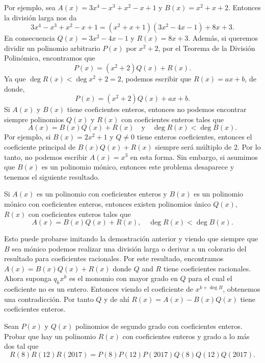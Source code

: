 Por ejemplo, sea $A(x) = 3x^4 - x^3 + x^2 - x + 1$ y $B(x) = x^2 + x + 2$.
Entonces la división larga nos da
\[
    3x^4 - x^3 + x^2 - x + 1 = (x^2 + x + 1)(3x^2 - 4x - 1) + 8x + 3.
\]
En consecuencia $Q(x) = 3x^2 - 4x - 1$ y $R(x) = 8x + 3$.
Además, si queremos dividir un polinomio arbitrario $P(x)$ por $x^2 + 2$, por el Teorema de la División Polinómica, encontramos que
\[
    P(x) = (x^2 + 2)Q(x) + R(x).
\]
Ya que $\deg{R(x)} < \deg{x^2 + 2} = 2$, podemos escribir que $R(x) = ax + b$, de donde,
\[
    P(x) = (x^2 + 2)Q(x) + ax + b.
\]
Si $A(x)$ y $B(x)$ tiene coeficientes enteros, entonces no podemos encontrar siempre polinomios $Q(x)$ y $R(x)$ con coeficientes enteros tales que
\[
    A(x) = B(x) Q(x) + R(x) \quad \text{y} \quad \deg{R(x)} < \deg{B(x)}.
\]
Por ejemplo, si $B(x) = 2x^2 + 1$ y $Q \neq 0$ tiene enteros coeficientes, entonces el coeficiente principal de $B(x) Q(x) + R(x)$ siempre será múltiplo de 2.
Por lo tanto, no podemos escribir $A(x) = x^3$ en esta forma.
Sin embargo, si asumimos que $B(x)$ es un polinomio mónico, entonces este problema desaparece y tenemos el siguiente resultado.

\begin{corollary}
    Si $A(x)$ es un polinomio con coeficientes enteros y $B(x)$ es un polinomio mónico con coeficientes enteros, entonces existen polinomios único $Q(x)$, $R(x)$ con coeficientes enteros tales que
    \[
        A(x) = B(x) Q(x) + R(x), \quad \deg{R(x)} < \deg{B(x)}.
    \]
\end{corollary}

Esto puede probarse imitando la demostración anterior y viendo que siempre que $B$ sea mónico podemos realizar una división larga o derivar a un colorario del resultado para coeficientes racionales.
Por este resultado, encontramos $A(x)=B(x)Q(x)+R(x)$ donde $Q$ and $R$ tiene coeficientes racionales.
Ahora suponga $q_k x^k$ es el monomio con mayor grado en $Q$ para el cual el coeficiente no es un entero.
Entonces viendo el coeficiente de $x^{k + \deg{B}}$, obtenemos una contradicción.
Por tanto $Q$ y de ahí $R(x)=A(x)-B(x)Q(x)$ tiene coeficientes enteros.

\begin{example}
    Sean $P(x)$ y $Q(x)$ polinomios de segundo grado con coeficientes enteros.
    Probar que hay un polinomio $R(x)$ con coeficientes enteros y grado a lo más dos tal que
    \[
        R(8)R(12)R(2017)=P(8)P(12)P(2017)Q(8)Q(12)Q(2017).
    \]
\end{example}

